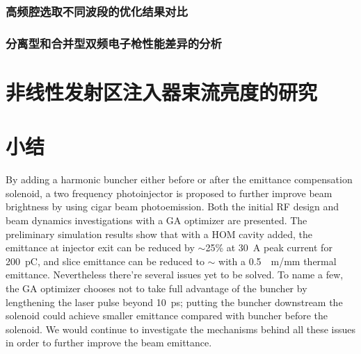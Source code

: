 \subsubsection{高频腔选取不同波段的优化结果对比}

\subsubsection{分离型和合并型双频电子枪性能差异的分析}

\section{非线性发射区注入器束流亮度的研究}

\section{小结}
By adding a harmonic buncher either before or after the emittance compensation solenoid, a two frequency photoinjector is proposed to further improve beam brightness by using cigar beam photoemission. Both the initial RF design and beam dynamics investigations with a GA optimizer are presented. The preliminary simulation results show that with a HOM cavity added, the emittance at injector exit can be reduced by $\sim$25\% at \SI{30}{A} peak current for \SI{200}{pC}, and slice emittance can be reduced to $\sim$ with a  \SI{0.5}{\mu m/mm} thermal emittance. Nevertheless there're several issues yet to be solved. To name a few, the GA optimizer chooses not to take full advantage of the buncher by lengthening the laser pulse beyond \SI{10}{ps}; putting the buncher downstream the solenoid could achieve smaller emittance compared with buncher before the solenoid. We would continue to investigate the mechanisms behind all these issues in order to further improve the beam emittance.
